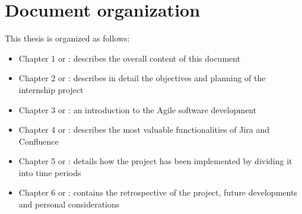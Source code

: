 \section{Document organization}
	This thesis is organized as follows:
	\begin{itemize}
		\item Chapter 1 or : describes the overall content of this document
		\item Chapter 2 or : describes in detail the objectives and planning of the internship project
		\item Chapter 3 or : an introduction to the Agile software development
		\item Chapter 4 or : describes the most valuable functionalities of Jira and Confluence
		\item Chapter 5 or : details how the project has been implemented by dividing it into time periods
		\item Chapter 6 or : contains the retrospective of the project, future developments and personal considerations
	\end{itemize}
